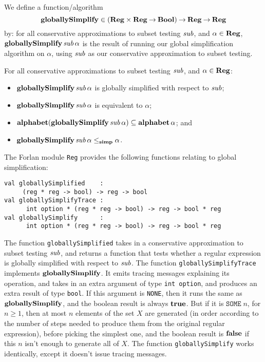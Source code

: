 We define a function/algorithm
%
\begin{displaymath}
\mathbf{globallySimplify}\in(\mathbf{Reg}\times\mathbf{Reg}\mathbin{\to}\mathbf{Bool})\mathbin{\to}\mathbf{Reg}\mathbin{\to}\mathbf{Reg} 
\end{displaymath}
by: for all conservative approximations to subset testing ${\it sub}$, and
$\alpha\in\mathbf{Reg}$, $\mathbf{globallySimplify}\,{\it sub}\,\alpha$ is the result
of running our global simplification algorithm on $\alpha$, using
${\it sub}$ as our conservative approximation to subset testing.

\begin{theorem}
For all conservative approximations to subset testing ${\it sub}$, and
$\alpha\in\mathbf{Reg}$:
\begin{itemize}
\item $\mathbf{globallySimplify}\,{\it sub}\,\alpha$ is globally simplified with
  respect to ${\it sub}$;

\item $\mathbf{globallySimplify}\,{\it sub}\,\alpha$ is equivalent to $\alpha$;

\item $\mathbf{alphabet}(\mathbf{globallySimplify}\,{\it sub}\,\alpha)\subseteq\mathbf{alphabet}\,\alpha$;
  and

\item $\mathbf{globallySimplify}\,{\it sub}\,\alpha\mathrel{\leq_{\mathbf{simp}}}\alpha$.
\end{itemize}
\end{theorem}

The Forlan module \texttt{Reg} provides the following functions
relating to global simplification:
\begin{verbatim}
val globallySimplified    :
     (reg * reg -> bool) -> reg -> bool
val globallySimplifyTrace :
      int option * (reg * reg -> bool) -> reg -> bool * reg
val globallySimplify      :
      int option * (reg * reg -> bool) -> reg -> bool * reg
\end{verbatim}
%
%
%

The function \texttt{globallySimplified} takes in a conservative
approximation to subset testing ${\it sub}$, and returns a function that
tests whether a regular expression is globally simplified with respect
to ${\it sub}$.  The function \texttt{globallySimplifyTrace} implements
$\mathbf{globallySimplify}$.  It emits tracing messages explaining its
operation, and takes in an extra argument of type \texttt{int~option},
and produces an extra result of type \texttt{bool}.  If this argument
is \texttt{NONE}, then it runs the same as $\mathbf{globallySimplify}$, and
the boolean result is always $\mathbf{true}$.  But if it is
$\mathtt{SOME}\;n$, for $n\geq 1$, then at most $n$ elements of the
set $X$ are generated (in order according to the number of steps
needed to produce them from the original regular expression), before
picking the simplest one, and the boolean result is $\mathbf{false}$ if this
$n$ isn't enough to generate all of $X$.  The function
\texttt{globallySimplify} works identically, except it doesn't issue
tracing messages.

